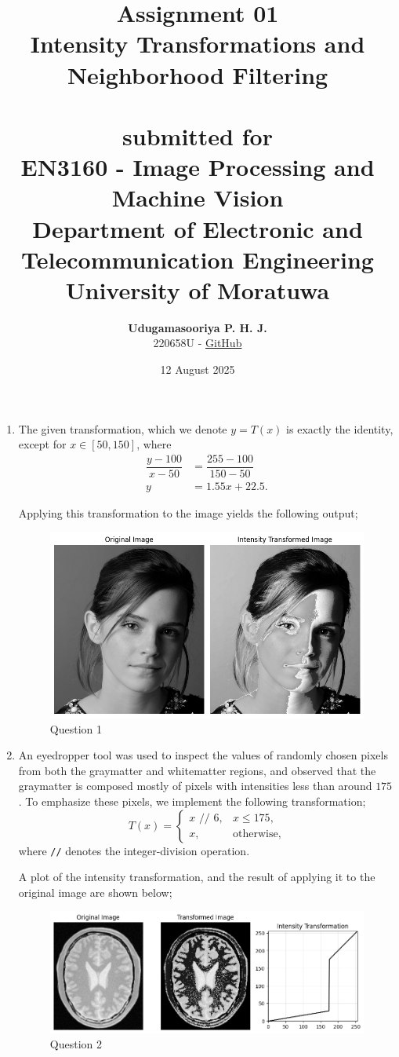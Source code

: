 \documentclass{article}[a4paper]
\title{
	\huge{\textbf{
		Assignment 01
	}}\\
	\Large{
		Intensity Transformations and Neighborhood Filtering
	}\\
	\phantom{}\\
	\large{
		submitted for
	}\\
	\LARGE{
		\textbf{EN3160 - Image Processing and Machine Vision}
	}\\
	\large{
		Department of Electronic and Telecommunication Engineering
	}
	\\
	\large{University of Moratuwa}
}
\author{
	\textbf{Udugamasooriya P. H. J.}\\
	220658U \quad - \quad \href{https://github.com/pulasthi-u/en3160-assignment01}{GitHub}\\
}
\date{12 August 2025}
\begin{document}
\maketitle

\begin{enumerate}
	\item The given transformation, which we denote $y=T(x)$ is exactly the identity, except for $x\in [50, 150]$, where
	\begin{align*}
		\dfrac{y - 100}{x - 50} &= \dfrac{255 - 100}{150 - 50} \\
		y &= 1.55x + 22.5.
	\end{align*}

	Applying this transformation to the image yields the following output;
	\begin{figure}[H]
		\centering
		\includegraphics[width=0.6\linewidth]{images/q1.png}
		\caption{Question 1}
	\end{figure}

	\item An eyedropper tool was used to inspect the values of randomly chosen pixels from both the graymatter and whitematter regions, and observed that
	the graymatter is composed mostly of pixels with intensities less than around $175$. To emphasize these pixels, we implement the following
	transformation; \[
		T(x) = 
		\begin{cases}
			x \texttt{ // } 6, & x \leq 175,		\\
			x,		& \text{otherwise},
		\end{cases}
	\] where \texttt{//} denotes the integer-division operation.
	
	A plot of the intensity transformation, and the result of applying it to the original image are shown below;
	\begin{figure}[H]
		\centering
		\includegraphics[width=0.9\linewidth]{images/q2.png}
		\caption{Question 2}
	\end{figure}


\end{enumerate}
\end{document}
